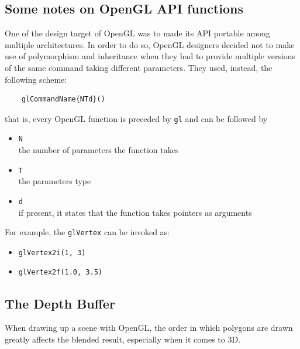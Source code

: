 \subsection{Some notes on OpenGL API functions}
One of the design target of OpenGL was to made its API portable 
among multiple architectures. In order to do so, OpenGL 
designers decided not to make use of polymorphism and inheritance 
when they had to provide multiple versions of the same command 
taking different parameters. They used, instead, the following scheme:
%
\begin{verbatim}
    glCommandName{NTd}()
\end{verbatim}
%
that is, every OpenGL function is preceded by \texttt{gl} and can be 
followed by
%
\begin{itemize}
  \item \texttt{N} \\
    the number of parameters the function takes
  \item \texttt{T} \\
    the parameters type
  \item \texttt{d} \\
    if present, it states that the function takes pointers as arguments
\end{itemize}
%
For example, the \texttt{glVertex} can be invoked as:
\begin{itemize}
\item \texttt{glVertex2i(1, 3)}
\item \texttt{glVertex2f(1.0, 3.5)}
\end{itemize}


%
\subsection{The Depth Buffer}
When drawing up a scene with OpenGL, the order in which polygons are drawn
greatly affects the blended result, especially when it comes to 3D.
%

